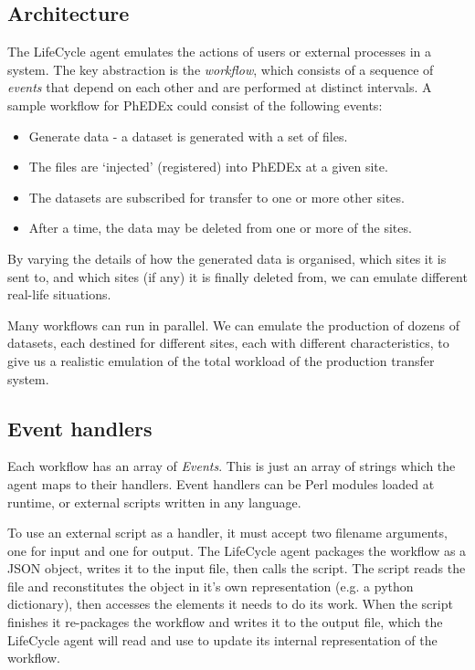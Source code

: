 \subsection{Architecture}
The LifeCycle agent emulates the actions of users or external processes in 
a system. The key abstraction is the {\it workflow}, which consists of a sequence of {\it events} 
that depend on each other and are performed at distinct intervals. A sample workflow for PhEDEx could consist of the following events:

\begin{itemize}
  \item Generate data - a dataset is generated with a set of files.
  \item The files are `injected' (registered) into PhEDEx at a given site.
  \item The datasets are subscribed for transfer to one or more other sites.
  \item After a time, the data may be deleted from one or more of the sites.
\end{itemize}

By varying the details of how the generated data is organised, which sites it is sent to, and 
which sites (if any) it is finally deleted from, we can emulate different real-life situations.

Many workflows can run in parallel. We can emulate the production of dozens of 
datasets, each destined for different sites, each with different characteristics, to give us a 
realistic emulation of the total workload of the production transfer system.

\subsection{Event handlers}
Each workflow has an array of {\it Events}. This is just an array of strings which the agent maps to their handlers. Event handlers can be Perl modules loaded at runtime, or external scripts written in any language.

To use an external script as a handler, it must accept two filename arguments, one for input and one for output. The LifeCycle agent packages the workflow as a JSON object, writes it to the input file, then calls the script. The script reads the file and reconstitutes the object in it's own representation (e.g. a python dictionary), then accesses the elements it needs to do its work. When the script finishes it re-packages the workflow and writes it to the output file, which the LifeCycle agent will read and use to update its internal representation of the workflow.


